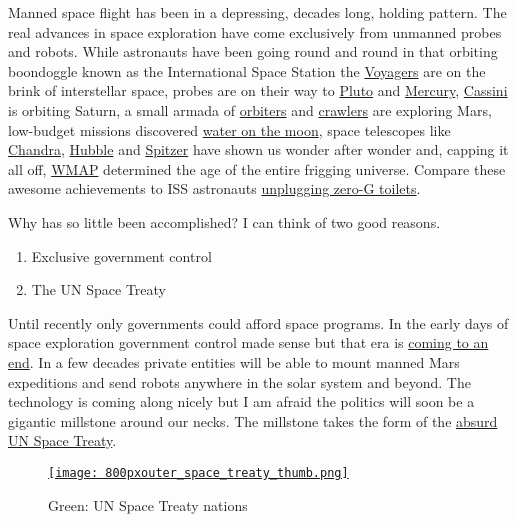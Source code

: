 Manned space flight has been in a depressing, decades long, holding
pattern. The real advances in space exploration have come exclusively
from unmanned probes and robots. While astronauts have been going round
and round in that orbiting boondoggle known as the International Space
Station the \href{http://voyager.jpl.nasa.gov/}{Voyagers} are on the
brink of interstellar space, probes are on their way to
\href{http://pluto.jhuapl.edu/}{Pluto} and
\href{http://messenger.jhuapl.edu/}{Mercury},
\href{http://saturn.jpl.nasa.gov/}{Cassini} is orbiting Saturn, a small
armada of
\href{http://www.esa.int/SPECIALS/Mars\_Express/index.html}{orbiters}
and \href{http://marsrover.nasa.gov/home/}{crawlers} are exploring Mars,
low-budget missions discovered
\href{http://online.wsj.com/article/SB10001424052702303339504575566194097878552.html}{water
on the moon}, space telescopes like
\href{http://chandra.harvard.edu/}{Chandra},
\href{http://hubblesite.org/hubble\_20/}{Hubble} and
\href{http://www.spitzer.caltech.edu/}{Spitzer} have shown us wonder
after wonder and, capping it all off,
\href{http://map.gsfc.nasa.gov/}{WMAP} determined the age of the entire
frigging universe. Compare these awesome achievements to ISS astronauts
\href{http://www.nationalledger.com/cgi-bin/artman/exec/view.cgi?archive=26\&num=20926}{unplugging
zero-G toilets}.

Why has so little been accomplished? I can think of two good reasons.

\begin{enumerate}
\item
  Exclusive government control
\item
  The UN Space Treaty
\end{enumerate}
Until recently only governments could afford space programs. In the
early days of space exploration government control made sense but that
era is \href{http://www.spacex.com/}{coming to an end}. In a few decades
private entities will be able to mount manned Mars expeditions and send
robots anywhere in the solar system and beyond. The technology is coming
along nicely but I am afraid the politics will soon be a gigantic
millstone around our necks. The millstone takes the form of the
\href{http://www.oosa.unvienna.org/oosa/SpaceLaw/outerspt.html}{absurd
UN Space Treaty}.


\captionsetup[figure]{labelformat=empty}
\begin{figure}[htbp]
\centering
\href{http://en.wikipedia.org/wiki/Outer\_Space\_Treaty}{\texttt{[image: 800pxouter\_space\_treaty\_thumb.png]}}
\caption{Green:  UN Space Treaty  nations}
\label{fig:1022X1}
\end{figure} 

